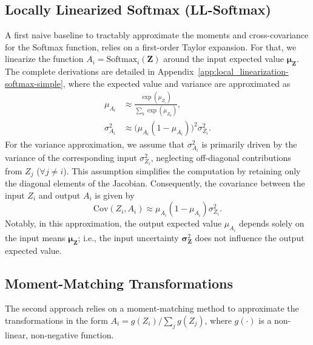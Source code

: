 \documentclass{uai2026} %
\begin{document}
\subsection{Locally Linearized Softmax (LL-Softmax)}\label{sec:linearized-softmax}
A first naive baseline to tractably approximate the moments and cross-covariance for the Softmax function, relies on a first-order Taylor expansion. For that, we linearize the function $A_i =\textrm{Softmax}_i(\bm{Z})$ around the input expected value $\bm{\mu}_{\bm{Z}}$. The complete derivations are detailed in Appendix~\ref{app:local_linearization-softmax-simple}, where the expected value and variance are approximated as
\begin{align*}
\mu_{A_i} &\approx \frac{\exp(\mu_{Z_i})}{\sum_k \exp(\mu_{Z_k})},\\
\sigma_{A_i}^2 &\approx \big(\mu_{A_i}(1-\mu_{A_i})\big)^2 \sigma_{Z_i}^2.
\end{align*}
For the variance approximation, we assume that $\sigma_{A_i}^2$ is primarily driven by the variance of the corresponding input $\sigma_{Z_i}^2$, neglecting off-diagonal contributions from $Z_j$ ($\forall j \neq i$). This assumption simplifies the computation by retaining only the diagonal elements of the Jacobian. Consequently, the covariance between the input $Z_i$ and output $A_i$ is given by
\begin{equation*}
\text{Cov}(Z_i, A_i) \approx \mu_{A_i}(1-\mu_{A_i}) \sigma_{Z_i}^2.
\end{equation*}
Notably, in this approximation, the output expected value $\mu_{A_i}$ depends solely on the input means $\bm{\mu}_{\bm{Z}}$; i.e., the input uncertainty $\bm{\sigma}_{\bm{Z}}^2$ does not influence the output expected value.

\subsection{Moment-Matching Transformations}\label{sec:moment-matching}
The second approach relies on a moment-matching method to approximate the transformations in the form $A_i = g(Z_i) / \sum_j g(Z_j)$, where $g(\cdot)$ is a non-linear, non-negative function.
\end{document}
